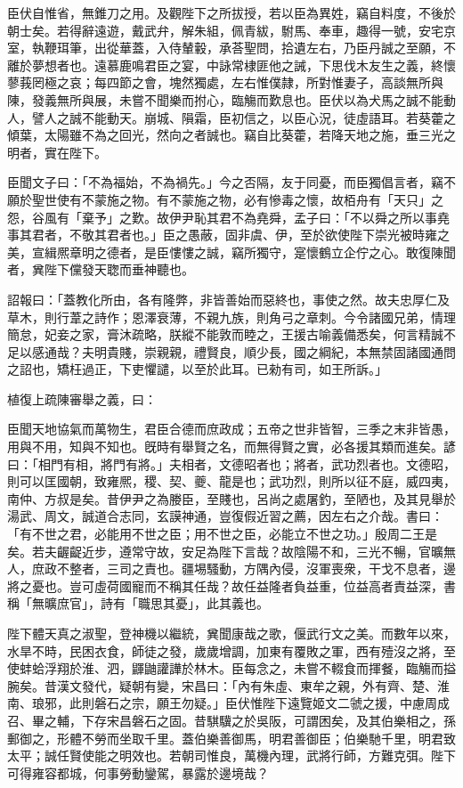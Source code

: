 \begin{pinyinscope}
臣伏自惟省，無錐刀之用。及觀陛下之所拔授，若以臣為異姓，竊自料度，不後於朝士矣。若得辭遠遊，戴武弁，解朱組，佩青紱，駙馬、奉車，趣得一號，安宅京室，執鞭珥筆，出從華蓋，入侍輦轂，承荅聖問，拾遺左右，乃臣丹誠之至願，不離於夢想者也。遠慕鹿鳴君臣之宴，中詠常棣匪他之誡，下思伐木友生之義，終懷蓼莪罔極之哀；每四節之會，塊然獨處，左右惟僕隷，所對惟妻子，高談無所與陳，發義無所與展，未嘗不聞樂而拊心，臨觴而歎息也。臣伏以為犬馬之誠不能動人，譬人之誠不能動天。崩城、隕霜，臣初信之，以臣心況，徒虛語耳。若葵藿之傾葉，太陽雖不為之回光，然向之者誠也。竊自比葵藿，若降天地之施，垂三光之明者，實在陛下。

臣聞文子曰：「不為福始，不為禍先。」今之否隔，友于同憂，而臣獨倡言者，竊不願於聖世使有不蒙施之物。有不蒙施之物，必有慘毒之懷，故栢舟有「天只」之怨，谷風有「棄予」之歎。故伊尹恥其君不為堯舜，孟子曰：「不以舜之所以事堯事其君者，不敬其君者也。」臣之愚蔽，固非虞、伊，至於欲使陛下崇光被時雍之美，宣緝熈章明之德者，是臣慺慺之誠，竊所獨守，寔懷鶴立企佇之心。敢復陳聞者，兾陛下儻發天聦而垂神聽也。

詔報曰：「蓋教化所由，各有隆弊，非皆善始而惡終也，事使之然。故夫忠厚仁及草木，則行葦之詩作；恩澤衰薄，不親九族，則角弓之章刺。今令諸國兄弟，情理簡怠，妃妾之家，膏沐疏略，朕縱不能敦而睦之，王援古喻義備悉矣，何言精誠不足以感通哉？夫明貴賤，崇親親，禮賢良，順少長，國之綱紀，本無禁固諸國通問之詔也，矯枉過正，下吏懼譴，以至於此耳。已勑有司，如王所訴。」

植復上疏陳審舉之義，曰：

臣聞天地協氣而萬物生，君臣合德而庶政成；五帝之世非皆智，三季之末非皆愚，用與不用，知與不知也。旣時有舉賢之名，而無得賢之實，必各援其類而進矣。諺曰：「相門有相，將門有將。」夫相者，文德昭者也；將者，武功烈者也。文德昭，則可以匡國朝，致雍熈，稷、契、夔、龍是也；武功烈，則所以征不庭，威四夷，南仲、方叔是矣。昔伊尹之為媵臣，至賤也，呂尚之處屠釣，至陋也，及其見舉於湯武、周文，誠道合志同，玄謨神通，豈復假近習之薦，因左右之介哉。書曰：「有不世之君，必能用不世之臣；用不世之臣，必能立不世之功。」殷周二王是矣。若夫齷齪近步，遵常守故，安足為陛下言哉？故陰陽不和，三光不暢，官曠無人，庶政不整者，三司之責也。疆埸騷動，方隅內侵，沒軍喪衆，干戈不息者，邊將之憂也。豈可虛荷國寵而不稱其任哉？故任益隆者負益重，位益高者責益深，書稱「無曠庶官」，詩有「職思其憂」，此其義也。

陛下體天真之淑聖，登神機以繼統，兾聞康哉之歌，偃武行文之美。而數年以來，水旱不時，民困衣食，師徒之發，歲歲增調，加東有覆敗之軍，西有殪沒之將，至使蚌蛤浮翔於淮、泗，鼲鼬讙譁於林木。臣每念之，未嘗不輟食而揮餐，臨觴而搤腕矣。昔漢文發代，疑朝有變，宋昌曰：「內有朱虛、東牟之親，外有齊、楚、淮南、琅邪，此則磐石之宗，願王勿疑。」臣伏惟陛下遠覽姬文二虢之援，中慮周成召、畢之輔，下存宋昌磐石之固。昔騏驥之於吳阪，可謂困矣，及其伯樂相之，孫郵御之，形體不勞而坐取千里。蓋伯樂善御馬，明君善御臣；伯樂馳千里，明君致太平；誠任賢使能之明效也。若朝司惟良，萬機內理，武將行師，方難克弭。陛下可得雍容都城，何事勞動鑾駕，暴露於邊境哉？


\end{pinyinscope}
